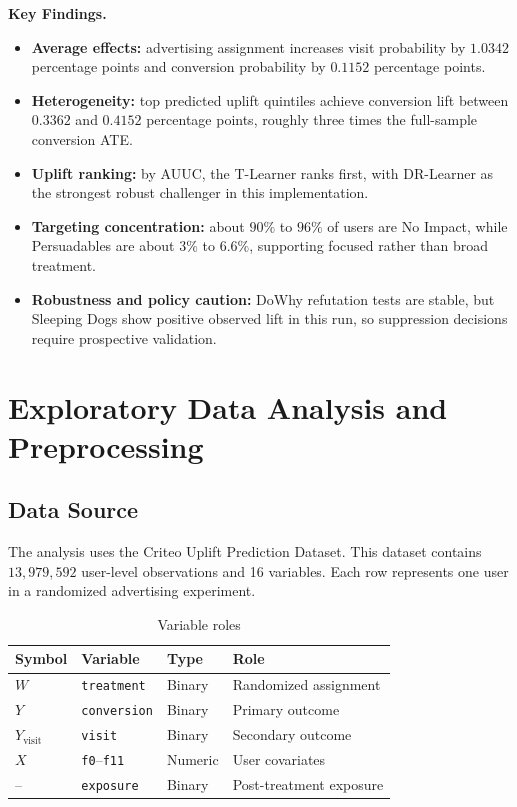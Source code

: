 \documentclass[journal,11pt,onecolumn]{IEEEtran}
\begin{document}
\textbf{Key Findings.}
\begin{itemize}
    \item \textbf{Average effects:} advertising assignment increases visit probability by \(1.0342\) percentage points and conversion probability by \(0.1152\) percentage points.
    \item \textbf{Heterogeneity:} top predicted uplift quintiles achieve conversion lift between \(0.3362\) and \(0.4152\) percentage points, roughly three times the full-sample conversion ATE.
    \item \textbf{Uplift ranking:} by AUUC, the T-Learner ranks first, with DR-Learner as the strongest robust challenger in this implementation.
    \item \textbf{Targeting concentration:} about \(90\%\) to \(96\%\) of users are No Impact, while Persuadables are about \(3\%\) to \(6.6\%\), supporting focused rather than broad treatment.
    \item \textbf{Robustness and policy caution:} DoWhy refutation tests are stable, but Sleeping Dogs show positive observed lift in this run, so suppression decisions require prospective validation.
\end{itemize}


\section{Exploratory Data Analysis and Preprocessing}

\subsection{Data Source}

The analysis uses the Criteo Uplift Prediction Dataset. This dataset contains \(13{,}979{,}592\) user-level observations and 16 variables. Each row represents one user in a randomized advertising experiment.

\begin{table}[!htbp]
    \centering
    \caption{Variable roles}
    \label{tab:variables}
    \small
    \begin{tabular}{llll}
        \toprule
        Symbol                 & Variable                  & Type    & Role                    \\
        \midrule
        \(W\)                  & \texttt{treatment}        & Binary  & Randomized assignment   \\
        \(Y\)                  & \texttt{conversion}       & Binary  & Primary outcome         \\
        \(Y_{\mathrm{visit}}\) & \texttt{visit}            & Binary  & Secondary outcome       \\
        \(X\)                  & \texttt{f0}--\texttt{f11} & Numeric & User covariates         \\
        --                     & \texttt{exposure}         & Binary  & Post-treatment exposure \\
        \bottomrule
    \end{tabular}
\end{table}
\end{document}
